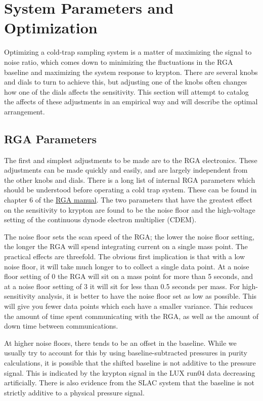 \section{System Parameters and Optimization}\label{sec:parmopt}
Optimizing a cold-trap sampling system is a matter of maximizing the signal to noise ratio, which comes down to minimizing the fluctuations in the RGA baseline and maximizing the system response to krypton. There are several knobs and dials to turn to achieve this, but adjusting one of the knobs often changes how one of the dials affects the sensitivity. This section will attempt to catalog the affects of these adjustments in an empirical way and will describe the optimal arrangement.
 

\subsection{RGA Parameters} 
The first and simplest adjustments to be made are to the RGA electronics. These adjustments can be made quickly and easily, and are largely independent from the other knobs and dials. There is a long list of internal RGA parameters which should be understood before operating a cold trap system. These can be found in chapter 6 of the \href{http://www.thinksrs.com/downloads/PDFs/Manuals/RGAm.pdf}{RGA manual}. The two parameters that have the greatest effect on the sensitivity to krypton are found to be the noise floor and the high-voltage setting of the continuous dynode electron multiplier (CDEM). 

The noise floor sets the scan speed of the RGA; the lower the noise floor setting, the longer the RGA will spend integrating current on a single mass point. The practical effects are threefold. The obvious first implication is that with a low noise floor, it will take much longer to to collect a single data point. At a noise floor setting of 0 the RGA will sit on a mass point for more than 5 seconds, and at a noise floor setting of 3 it will sit for less than 0.5 seconds per mass. For high-sensitivity analysis, it is better to have the noise floor set as low as possible. This will give you fewer data points which each have a smaller variance. This reduces the amount of time spent communicating with the RGA, as well as the amount of down time between communications. 

At higher noise floors, there tends to be an offset in the baseline. While we usually try to account for this by using baseline-subtracted pressures in purity calculations, it is possible that the shifted baseline is not additive to the pressure signal. This is indicated by the krypton signal in the LUX run04 data decreasing artificially. There is also evidence from the SLAC system that the baseline is not strictly additive to a physical pressure signal.

